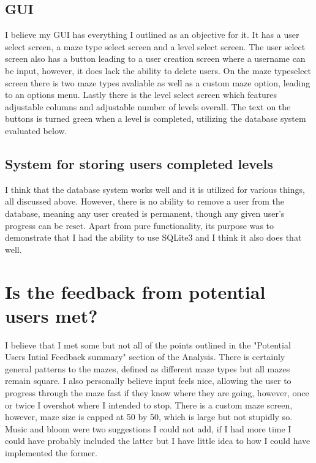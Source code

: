 \documentclass{article}
\begin{document}
\subsection{GUI}
I believe my GUI has everything I outlined as an objective for it. It has a user select screen, a maze type select screen and a level select screen. The user select screen also has a button leading to a user creation screen where a username can be input, however, it does lack the ability to delete users. On the maze typeselect screen there is two maze types avaliable as well as a custom
 maze option, leading to an options menu. Lastly there is the level select screen which features adjustable columns and adjustable number of levels overall. The text on the buttons is turned green when a level is completed, utilizing the database system evaluated below.

\clearpage
\subsection{System for storing users completed levels}
I think that the database system works well and it is utilized for various things, all discussed above. However, there is no ability to remove a user from the database, meaning any user created is permanent, though any given user's progress can be reset. Apart from pure functionality, its purpose was to demonstrate that I had the ability to use SQLite3 and I think it also does that well.

\section{Is the feedback from potential users met?}
I believe that I met some but not all of the points outlined in the "Potential Users Intial Feedback summary" section of the Analysis. There is certainly general patterns to the mazes, defined as different maze types but all mazes remain square. I also personally believe input feels nice, allowing the user to progress through the maze fast if they know where they are going, however, once or twice I overshot where I intended to stop. There is a custom maze screen, however, maze size is capped at 50 by 50, which is large but not stupidly so. Music and bloom were two suggestions I could not add, if I had more time I could have probably included the latter but I have little idea to how I could have implemented the former.
\end{document}
